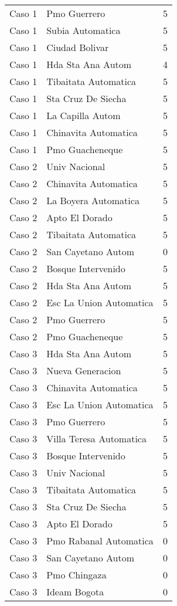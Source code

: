 \begin{itemize}
\begin{longtable}{lll}
Caso 1 & Pmo Guerrero  & 5 \\
Caso 1 & Subia Automatica  & 5 \\
Caso 1 & Ciudad Bolivar  & 5 \\
Caso 1 & Hda Sta Ana Autom  & 4 \\
Caso 1 & Tibaitata Automatica  & 5 \\
Caso 1 & Sta Cruz De Siecha  & 5 \\
Caso 1 & La Capilla Autom  & 5 \\
Caso 1 & Chinavita Automatica  & 5 \\
Caso 1 & Pmo Guacheneque  & 5 \\
Caso 2 & Univ Nacional  & 5 \\
Caso 2 & Chinavita Automatica  & 5 \\
Caso 2 & La Boyera Automatica  & 5 \\
Caso 2 & Apto El Dorado  & 5 \\
Caso 2 & Tibaitata Automatica  & 5 \\
Caso 2 & San Cayetano Autom   & 0 \\
Caso 2 & Bosque Intervenido    & 5 \\
Caso 2 & Hda Sta Ana Autom  & 5 \\
Caso 2 & Esc La Union Automatica & 5 \\
Caso 2 & Pmo Guerrero  & 5 \\
Caso 2 & Pmo Guacheneque  & 5 \\
Caso 3 & Hda Sta Ana Autom  & 5 \\
Caso 3 & Nueva Generacion  & 5 \\
Caso 3 & Chinavita Automatica  & 5 \\
Caso 3 & Esc La Union Automatica & 5 \\
Caso 3 & Pmo Guerrero  & 5 \\
Caso 3 & Villa Teresa Automatica  & 5 \\
Caso 3 & Bosque Intervenido    & 5 \\
Caso 3 & Univ Nacional  & 5 \\
Caso 3 & Tibaitata Automatica  & 5 \\
Caso 3 & Sta Cruz De Siecha  & 5 \\
Caso 3 & Apto El Dorado  & 5 \\
Caso 3 & Pmo Rabanal Automatica   & 0 \\
Caso 3 & San Cayetano Autom   & 0 \\
Caso 3 & Pmo Chingaza  & 0 \\
Caso 3 & Ideam Bogota  & 0 \\

\end{longtable}
\end{itemize}
